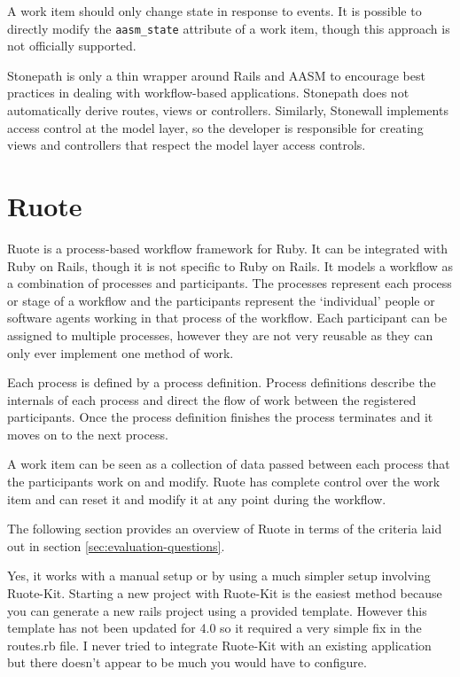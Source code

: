 \documentclass[document.tex]{subfiles}
\begin{document}

A work item should only change state in response to events. It is possible to directly modify the \verb!aasm_state! attribute of a work item, though this approach is not officially supported.


Stonepath is only a thin wrapper around Rails and AASM to encourage best practices in dealing with workflow-based applications. Stonepath does not automatically derive routes, views or controllers. Similarly, Stonewall implements access control at the model layer, so the developer is responsible for creating views and controllers that respect the model layer access controls.


\section {Ruote}
Ruote is a process-based workflow framework for Ruby. It can be integrated with Ruby on Rails, though it is not specific to Ruby on Rails. It models a workflow as a combination of processes and participants. The processes represent each process or stage of a workflow and the participants represent the ‘individual' people or software agents working in that process of the workflow. Each participant can be assigned to multiple processes, however they are not very reusable as they can only ever implement one method of work.

Each process is defined by a process definition. Process definitions describe the internals of each process and direct the flow of work between the registered participants. Once the process definition finishes the process terminates and it moves on to the next process.

A work item can be seen as a collection of data passed between each process that the participants work on and modify. Ruote has complete control over the work item and can reset it and modify it at any point during the workflow.

The following section provides an overview of Ruote in terms of the criteria laid out in section \ref{sec:evaluation-questions}.


Yes, it works with a manual setup or by using a much simpler setup involving Ruote-Kit. Starting a new project with Ruote-Kit is the easiest method because you can generate a new rails project using a provided template. However this template has not been updated for 4.0 so it required a very simple fix in the routes.rb file. I never tried to integrate Ruote-Kit with an existing application but there doesn't appear to be much you would have to configure.
\end{document}
